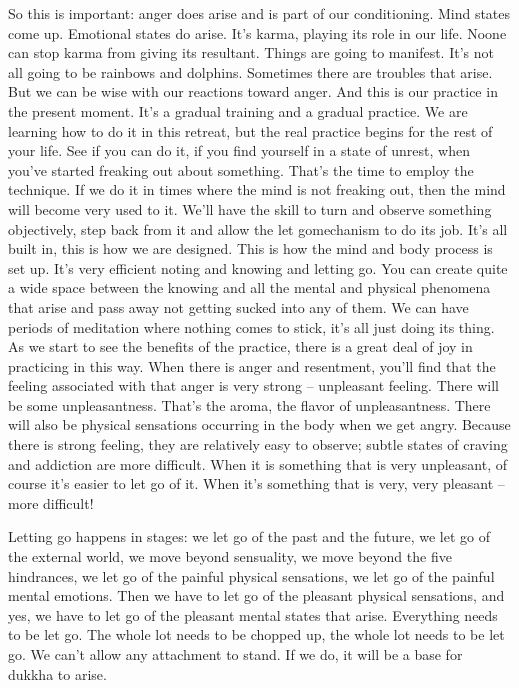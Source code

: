 \documentclass[letterpaper,10pt,english]{sphinxmanual}
\begin{document}
\sphinxAtStartPar
So this is important: anger does arise and is part of our conditioning.
Mind states come up. Emotional states do arise. It’s karma, playing its role in
our life. No\sphinxhyphen{}one can stop karma from giving its resultant. Things are going to
manifest. It’s not all going to be rainbows and dolphins. Sometimes there are
troubles that arise. But we can be wise with our reactions toward anger. And
this is our practice in the present moment. It’s a gradual training and a gradual practice. We are learning how to do it in this retreat, but the real practice
begins for the rest of your life. See if you can do it, if you find yourself in
a state of unrest, when you’ve started freaking out about something. That’s
the time to employ the technique. If we do it in times where the mind is not
freaking out, then the mind will become very used to it. We’ll have the skill
to turn and observe something objectively, step back from it and allow the
let go\sphinxhyphen{}mechanism to do its job. It’s all built in, this is how we are designed.
This is how the mind and body process is set up. It’s very efficient noting
and  knowing  and  letting  go.  You  can  create  quite  a  wide  space  between
the knowing and all the mental and physical phenomena that arise and pass
away not getting sucked into any of them. We can have periods of meditation where nothing comes to stick, it’s all just doing its thing. As we start
to see the benefits of the practice, there is a great deal of joy in practicing
in this way. When there is anger and resentment, you’ll find that the feeling
associated with that anger is very strong – unpleasant feeling. There will be
some unpleasantness. That’s the aroma, the flavor of unpleasantness. There
will also be physical sensations occurring in the body when we get angry.
Because there is strong feeling, they are relatively easy to observe; subtle
states of craving and addiction are more difficult. When it is something that
is very unpleasant, of course it’s easier to let go of it. When it’s something
that is very, very pleasant – more difficult!

\sphinxAtStartPar
Letting go happens in stages: we let go of the past and the future, we
let go of the external world, we move beyond sensuality, we move beyond
the five hindrances, we let go of the painful physical sensations, we let go of
  the painful mental emotions. Then we have to let go of the pleasant physical
sensations, and yes, we have to let go of the pleasant mental states that arise.
Everything needs to be let go. The whole lot needs to be chopped up, the
whole lot needs to be let go. We can’t allow any attachment to stand. If we
do, it will be a base for dukkha to arise.
\end{document}

